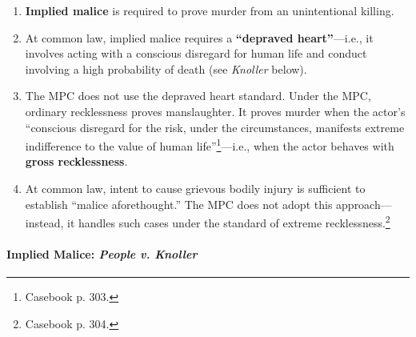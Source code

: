 \begin{enumerate}
    \item \textbf{Implied malice} is required to prove murder from an unintentional killing.
    \item At common law, implied malice requires a \textbf{``depraved heart''}---i.e., it involves acting with a conscious disregard for human life and conduct involving a high probability of death (see \emph{Knoller} below).
    \item The MPC does not use the depraved heart standard. Under the MPC, ordinary recklessness proves manslaughter. It proves murder when the actor's ``conscious disregard for the risk, under the circumstances, manifests extreme indifference to the value of human life''\footnote{Casebook p. 303.}---i.e., when the actor behaves with \textbf{gross recklessness}.
    \item At common law, intent to cause grievous bodily injury is sufficient to establish ``malice aforethought.'' The MPC does not adopt this approach---instead, it handles such cases under the standard of extreme recklessness.\footnote{Casebook p. 304.}
\end{enumerate}

\paragraph{Implied Malice: \emph{People v. Knoller}}

